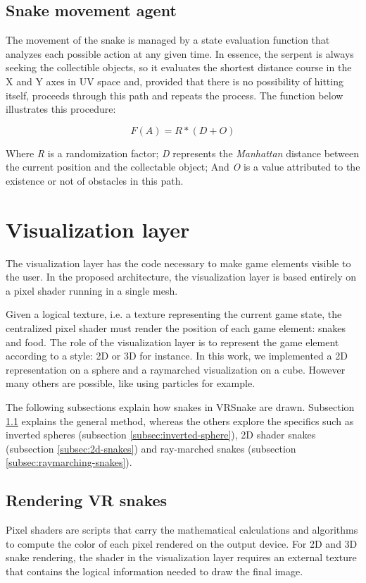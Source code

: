 \documentclass[runningheads]{llncs}
\begin{document}
\subsection{Snake movement agent} \label{sec:agent}
The movement of the snake is managed by a state evaluation function that analyzes each possible action at any given time. In essence, the serpent is always seeking  the collectible objects, so it evaluates the shortest distance course in the X and Y axes in UV space and, provided that there is no possibility of hitting itself, proceeds through this path and repeats the process. The function below illustrates this procedure:

\begin{equation}
F(A) = R * (D + O)
\label{equation11}
\end{equation}

Where \textit{R} is a randomization factor; \textit{D} represents the \textit{Manhattan} distance between the current position and the collectable object; And \textit{O} is a value attributed to the existence or not of obstacles in this path.

\section{Visualization layer}
\label{sec:visualization-layer}
The visualization layer has the code necessary to make game elements visible to the user. In the proposed architecture, the visualization layer is based entirely on a pixel shader running in a single mesh.


Given a logical texture, i.e. a texture representing the current game state, the centralized pixel shader must render the position of each game element: snakes and food. The role of the visualization layer is to represent the game element according to a style: 2D or 3D for instance. In this work, we implemented a 2D representation on a sphere and a raymarched visualization on a cube. However many others are possible, like using particles for example.


The following subsections explain how snakes in VRSnake are drawn. Subsection \ref{subsec:rendering-snakes} explains the general method, whereas the others explore the specifics such as inverted spheres (subsection \ref{subsec:inverted-sphere}), 2D shader snakes (subsection \ref{subsec:2d-snakes}) and ray-marched snakes (subsection \ref{subsec:raymarching-snakes}).

\subsection{Rendering VR snakes}
\label{subsec:rendering-snakes}
Pixel shaders are scripts that carry the mathematical calculations and algorithms to compute the color of each pixel rendered on the output device. For 2D and 3D snake rendering, the shader in the visualization layer requires an external texture that contains the logical information needed to draw the final image.
\end{document}
